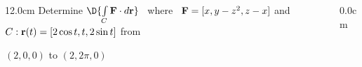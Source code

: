 \begin{frame}
\frametitle{}
\scriptsize
\begin{columns}\begin{column}{12.0cm}
\EX	Determine $\D{ \int \limits_{C} {\bf F} \cdot d{\bf r}}$ \, where \, ${\bf F} = [x,y-z^2,z-x]$ and $C: {\bf r}(t) = [2\cos t, t, 2\sin t]$ from

\hspace{9.5cm} $(2,0,0)$ to $(2,2\pi,0)$

\vspace{0.2cm}

\SOL

\vspace{7.2cm}

\end{column}\begin{column}{0.0cm}\end{column}\end{columns}
\end{frame}

